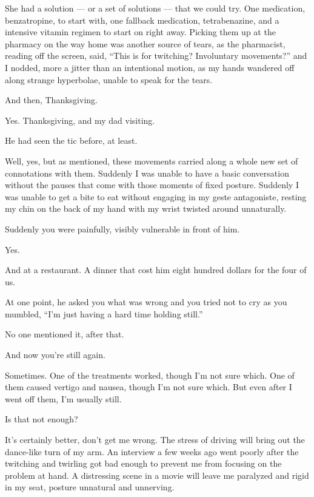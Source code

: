 \begin{paracol}{2}
\begin{leftcolumn}
She had a solution --- or a set of solutions --- that we could try. One medication, benzatropine, to start with, one fallback medication, tetrabenazine, and a intensive vitamin regimen to start on right away. Picking them up at the pharmacy on the way home was another source of tears, as the pharmacist, reading off the screen, said, ``This is for twitching? Involuntary movements?'' and I nodded, more a jitter than an intentional motion, as my hands wandered off along strange hyperbolae, unable to speak for the tears.

\begin{ally}
And then, Thanksgiving.
\end{ally}
Yes. Thanksgiving, and my dad visiting.

\begin{ally}
He had seen the tic before, at least.
\end{ally}
Well, yes, but as mentioned, these movements carried along a whole new set of connotations with them. Suddenly I was unable to have a basic conversation without the pauses that come with those moments of fixed posture. Suddenly I was unable to get a bite to eat without engaging in my geste antagoniste, resting my chin on the back of my hand with my wrist twisted around unnaturally.

\begin{ally}
Suddenly you were painfully, visibly vulnerable in front of him.
\end{ally}
Yes.

And at a restaurant. A dinner that cost him eight hundred dollars for the four of us.

\begin{ally}
At one point, he asked you what was wrong and you tried not to cry as you mumbled, ``I'm just having a hard time holding still.''
\end{ally}
No one mentioned it, after that.
\newpage

\begin{ally}
And now you're still again.
\end{ally}
Sometimes. One of the treatments worked, though I'm not sure which. One of them caused vertigo and nausea, though I'm not sure which. But even after I went off them, I'm usually still.

\begin{ally}
Is that not enough?
\end{ally}
It's certainly better, don't get me wrong. The stress of driving will bring out the dance-like turn of my arm. An interview a few weeks ago went poorly after the twitching and twirling got bad enough to prevent me from focusing on the problem at hand. A distressing scene in a movie will leave me paralyzed and rigid in my seat, posture unnatural and unnerving.


\end{leftcolumn}
\end{paracol}
